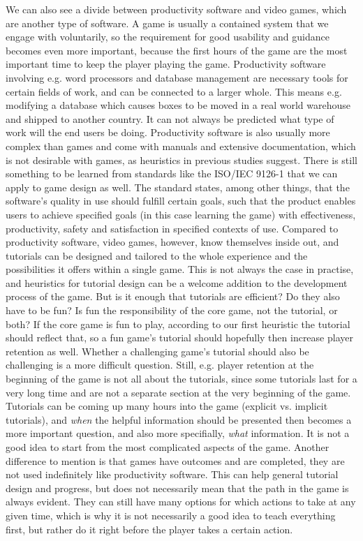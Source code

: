 We can also see a divide between productivity software and video games, which are another type of software. A game is usually a contained system that we engage with voluntarily, so the requirement for good usability and guidance becomes even more important, because the first hours of the game are the most important time to keep the player playing the game. Productivity software involving e.g. word processors and database management are necessary tools for certain fields of work, and can be connected to a larger whole. This means e.g. modifying a database which causes boxes to be moved in a real world warehouse and shipped to another country. It can not always be predicted what type of work will the end users be doing. Productivity software is also usually more complex than games and come with manuals and extensive documentation, which is not desirable with games, as heuristics in previous studies suggest. There is still something to be learned from standards like the ISO/IEC 9126-1 that we can apply to game design as well. The standard states, among other things, that the software's quality in use should fulfill certain goals, such that the product enables users to achieve specified goals (in this case learning the game) with effectiveness, productivity, safety and satisfaction in specified contexts of use. Compared to productivity software, video games, however, know themselves inside out, and tutorials can be designed and tailored to the whole experience and the possibilities it offers within a single game. This is not always the case in practise, and heuristics for tutorial design can be a welcome addition to the development process of the game. But is it enough that tutorials are efficient? Do they also have to be fun? Is fun the responsibility of the core game, not the tutorial, or both? If the core game is fun to play, according to our first heuristic the tutorial should reflect that, so a fun game's tutorial should hopefully then increase player retention as well. Whether a challenging game's tutorial should also be challenging is a more difficult question. Still, e.g. player retention at the beginning of the game is not all about the tutorials, since some tutorials last for a very long time and are not a separate section at the very beginning of the game. Tutorials can be coming up many hours into the game (explicit vs. implicit tutorials), and \textit{when} the helpful information should be presented then becomes a more important question, and also more specifially, \textit{what} information. It is not a good idea to start from the most complicated aspects of the game. Another difference to mention is that games have outcomes and are completed, they are not used indefinitely like productivity software. This can help general tutorial design and progress, but does not necessarily mean that the path in the game is always evident. They can still have many options for which actions to take at any given time, which is why it is not necessarily a good idea to teach everything first, but rather do it right before the player takes a certain action.

